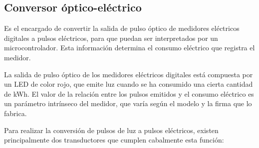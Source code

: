 \subsection{Conversor óptico-eléctrico}

Es el encargado de convertir la salida de pulso óptico de medidores eléctricos digitales a pulsos eléctricos, para que puedan ser interpretados por un microcontrolador. Esta información determina el consumo eléctrico que registra el medidor.

La salida de pulso óptico de los medidores eléctricos digitales está compuesta por un LED de color rojo, que emite luz cuando se ha consumido una cierta cantidad de kWh. El valor de la relación entre los pulsos emitidos y el consumo eléctrico es un parámetro intrínseco del medidor, que varía según el modelo y la firma que lo fabrica.

Para realizar la conversión de pulsos de luz a pulsos eléctricos, existen principalmente dos transductores que cumplen cabalmente esta función:


